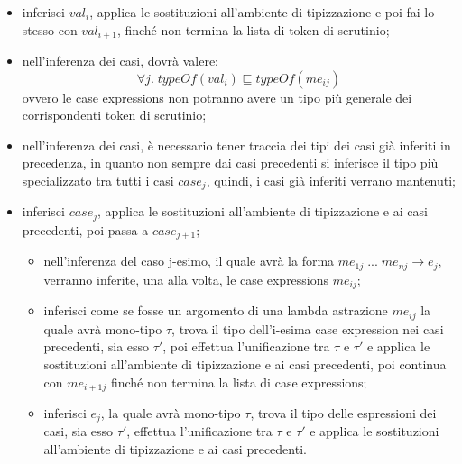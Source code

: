 \documentclass[10pt,a4paper]{article}
\begin{document}
\begin{itemize}
    \item inferisci $ val_i $, applica le sostituzioni all'ambiente di tipizzazione e poi fai lo stesso con $ val_{i+1} $,
    finché non termina la lista di token di scrutinio;
    \item nell'inferenza dei casi, dovrà valere:
        \[ \forall j. \; typeOf(val_i) \sqsubseteq typeOf(me_{ij}) \]
    ovvero le case expressions non potranno avere un tipo più generale dei corrispondenti token di scrutinio;
    \item nell'inferenza dei casi, è necessario tener traccia dei tipi dei casi già inferiti in precedenza, in
    quanto non sempre dai casi precedenti si inferisce il tipo più specializzato tra tutti i casi $ case_j $, quindi,
    i casi già inferiti verrano mantenuti;
    \item inferisci $ case_j $, applica le sostituzioni all'ambiente di tipizzazione e ai casi precedenti, poi passa
    a $ case_{j+1} $;
    \begin{itemize}
        \item nell'inferenza del caso j-esimo, il quale avrà la forma $ me_{1j} \; ... \; me_{nj} \rightarrow e_j $,
        verranno inferite, una alla volta, le case expressions $ me_{ij} $;
        \item inferisci come se fosse un argomento di una lambda astrazione $ me_{ij} $ la quale avrà mono-tipo $ \tau $,
        trova il tipo dell'i-esima case expression nei casi precedenti, sia esso $ \tau' $, poi effettua
        l'unificazione tra $ \tau $ e $ \tau' $ e applica le sostituzioni
        all'ambiente di tipizzazione e ai casi precedenti, poi continua con $ me_{i+1j} $ finché non termina la lista di
        case expressions;
        \item inferisci $ e_j $, la quale avrà mono-tipo $ \tau $, trova il tipo delle espressioni dei casi, sia esso
        $ \tau' $, effettua l'unificazione tra $ \tau $ e $ \tau' $ e applica le sostituzioni all'ambiente di tipizzazione
        e ai casi precedenti.
    \end{itemize}
\end{itemize}
\end{document}

